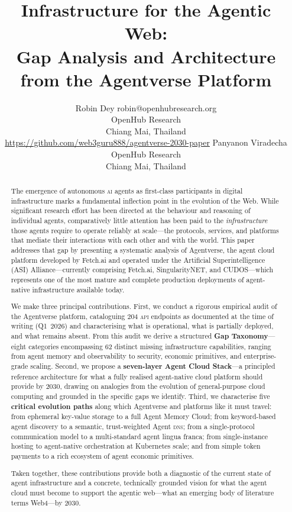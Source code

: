 \documentclass[twoside,11pt]{article}
\title{Infrastructure for the Agentic Web:\\
       Gap Analysis and Architecture from the Agentverse Platform}
\author{\name Robin Dey \email robin@openhubresearch.org \\
        \addr OpenHub Research \\
        Chiang Mai, Thailand \\
        \url{https://github.com/web3guru888/agentverse-2030-paper}
        \AND
        \name Panyanon Viradecha \\
        \addr OpenHub Research \\
        Chiang Mai, Thailand}
\begin{document}
\maketitle

\begin{abstract}%
The emergence of autonomous \textsc{ai} agents as first-class participants in
digital infrastructure marks a fundamental inflection point in the evolution of
the Web.  While significant research effort has been directed at the behaviour
and reasoning of individual agents, comparatively little attention has been
paid to the \emph{infrastructure} those agents require to operate reliably at
scale---the protocols, services, and platforms that mediate their interactions
with each other and with the world.  This paper addresses that gap by
presenting a systematic analysis of Agentverse, the agent cloud platform
developed by Fetch.ai and operated under the Artificial Superintelligence (ASI)
Alliance---currently comprising Fetch.ai, SingularityNET, and CUDOS---which
represents one of the most mature and complete production deployments of
agent-native infrastructure available today.

We make three principal contributions.  First, we conduct a rigorous empirical
audit of the Agentverse platform, cataloguing 204 \textsc{api} endpoints
as documented at the time of writing (Q1~2026) and characterising what is
operational, what is partially deployed, and what remains absent.  From this audit we derive a structured \textbf{Gap
Taxonomy}---eight categories encompassing 62 distinct missing
infrastructure capabilities, ranging from agent memory and observability to
security, economic primitives, and enterprise-grade scaling.  Second, we
propose a \textbf{seven-layer Agent Cloud Stack}---a principled reference
architecture for what a fully realised agent-native cloud platform should
provide by 2030, drawing on analogies from the evolution of general-purpose
cloud computing and grounded in the specific gaps we identify.  Third, we
characterise five \textbf{critical evolution paths} along which Agentverse and
platforms like it must travel: from ephemeral key-value storage to a full Agent
Memory Cloud; from keyword-based agent discovery to a semantic, trust-weighted
Agent \textsc{dns}; from a single-protocol communication model to a
multi-standard agent lingua franca; from single-instance hosting to
agent-native orchestration at Kubernetes scale; and from simple token payments
to a rich ecosystem of agent economic primitives.

Taken together, these contributions provide both a diagnostic of the current
state of agent infrastructure and a concrete, technically grounded vision for
what the agent cloud must become to support the agentic web---what an emerging
body of literature terms Web4---by 2030.
\end{abstract}
\end{document}
